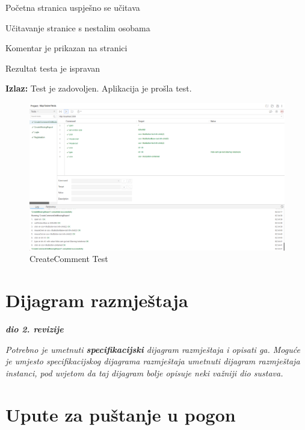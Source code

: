			\begin{packed_enum}
				
				\item Početna stranica uspješno se učitava
				\item Učitavanje stranice s nestalim osobama
				\item Komentar je prikazan na stranici
				\item Rezultat testa je ispravan
				
			\end{packed_enum}
			
			\noindent \textbf{Izlaz:} Test je zadovoljen. Aplikacija je prošla test.
			
			\begin{figure}[H] \includegraphics[width=\linewidth]{./slike/Testovi/Selenium/Selenium_4.png}
				\caption{CreateComment Test}
			\end{figure}
			
			\eject
		
		
		\section{Dijagram razmještaja}
			
			\textbf{\textit{dio 2. revizije}}
			
			 \textit{Potrebno je umetnuti \textbf{specifikacijski} dijagram razmještaja i opisati ga. Moguće je umjesto specifikacijskog dijagrama razmještaja umetnuti dijagram razmještaja instanci, pod uvjetom da taj dijagram bolje opisuje neki važniji dio sustava.}
			
			\eject 
		
		\section{Upute za puštanje u pogon}
		
